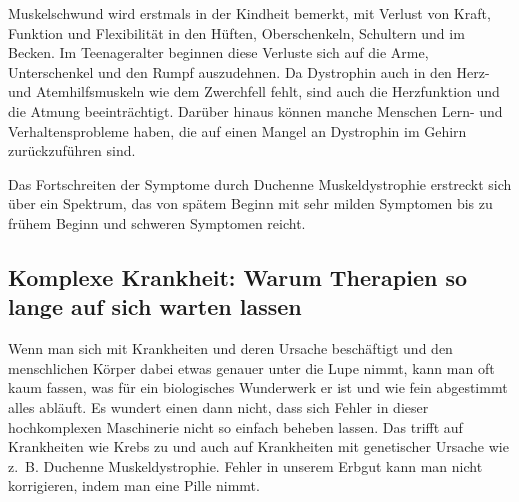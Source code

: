 \documentclass[fontsize=14pt,a4paper,headinclude,DIV=calc,automark]{scrbook}
\begin{document}
Muskelschwund wird erstmals in der Kindheit bemerkt, mit Verlust von Kraft, Funktion und Flexibilität in den Hüften, Oberschenkeln, Schultern und im Becken. Im Teenageralter beginnen diese Verluste sich auf die Arme, Unterschenkel und den Rumpf auszudehnen. Da Dystrophin auch in den Herz- und Atemhilfsmuskeln wie dem Zwerchfell fehlt, sind auch die Herzfunktion und die Atmung beeinträchtigt. Darüber hinaus können manche Menschen Lern- und Verhaltensprobleme haben, die auf einen Mangel an Dystrophin im Gehirn zurückzuführen sind.

Das Fortschreiten der Symptome durch Duchenne Muskeldystrophie erstreckt sich über ein Spektrum, das von spätem Beginn mit sehr milden Symptomen bis zu frühem Beginn und schweren Symptomen reicht.


\subsection{Komplexe Krankheit: Warum Therapien so lange auf sich warten lassen}

Wenn man sich mit Krankheiten und deren Ursache beschäftigt und den menschlichen Körper dabei etwas genauer unter die Lupe nimmt, kann man oft kaum fassen, was für ein biologisches Wunderwerk er ist und wie fein abgestimmt alles abläuft. Es wundert einen dann nicht, dass sich Fehler in dieser hochkomplexen Maschinerie nicht so einfach beheben lassen. Das trifft auf Krankheiten wie Krebs zu und auch auf Krankheiten mit genetischer Ursache wie z.~B. Duchenne Muskeldystrophie. Fehler in unserem Erbgut kann man nicht korrigieren, indem man eine Pille nimmt.
\end{document}
